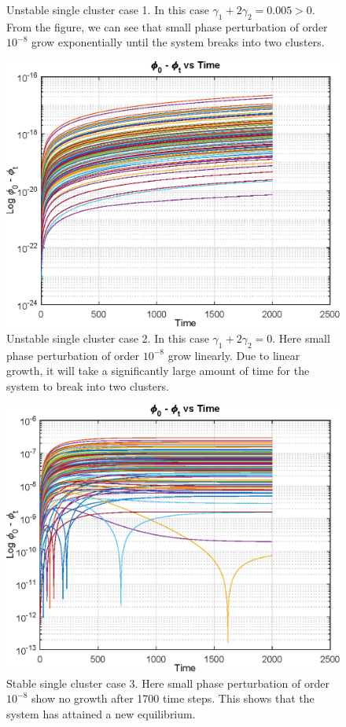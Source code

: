 \documentclass[superscriptaddress,reprint,amssymb, amsmath,aps, pre]{revtex4-1}
\begin{document}
{{\begin{figure}[h!]
            \caption{Unstable single cluster case 1. In this case \(\gamma_1 + 2\gamma_2 = 0.005 > 0\). From the figure, we can see that small phase perturbation of order \(10^{-8}\) grow exponentially until the system breaks into two clusters.}
            \label{fig:case1}
        \end{figure}
        \begin{figure}[h!]
            \includegraphics[width = \linewidth]{LinearUnstable.eps}
            \caption{Unstable single cluster case 2. In this case \(\gamma_1 + 2\gamma_2 = 0\). Here small phase perturbation of order \(10^{-8}\) grow linearly. Due to linear growth, it will take a significantly large amount of time for the system to break into two clusters.}
            \label{fig:case2}
        \end{figure}
        \begin{figure}[h!]
            \includegraphics[width = \linewidth]{negativeStable.eps}
            \caption{Stable single cluster case 3. Here small phase perturbation of order \(10^{-8}\) show no growth after 1700 time steps. This shows that the system has attained a new equilibrium.}
            \label{fig:case3}
        \end{figure}

}}
\end{document}
